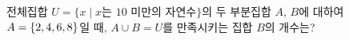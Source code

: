 전체집합 $U=\{x \mid x$는 $10$ 미만의 자연수$\}$의 두 부분집합 $A$, $B$에 대하여 $A=\{2{,}\mkern3mu\mathopen{}4{,}\mkern3mu\mathopen{}6{,}\mkern3mu\mathopen{}8\}$일 때, $A\cup B=U$를 만족시키는 집합 $B$의 개수는?
